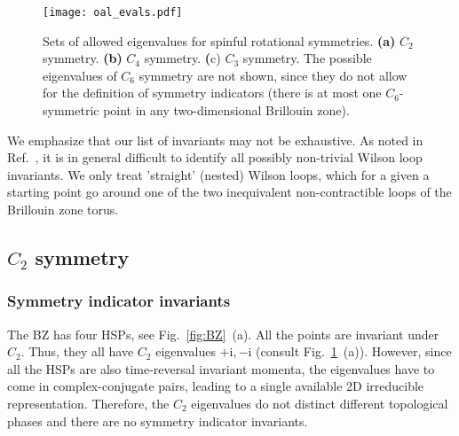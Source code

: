 \begin{figure}[H]
\centering
\texttt{[image: oal\_evals.pdf]}
\caption[Sets of allowed eigenvalues for spinful rotational symmetries]{Sets of allowed eigenvalues for spinful rotational symmetries. \textbf{(a)} $C_2$ symmetry. \textbf{(b)} $C_4$ symmetry. \textbf({c)} $C_3$ symmetry. The possible eigenvalues of $C_6$ symmetry are not shown, since they do not allow for the definition of symmetry indicators (there is at most one $C_6$-symmetric point in any two-dimensional Brillouin zone).}
\label{fig:eigvalsets}
\end{figure}

We emphasize that our list of invariants may not be exhaustive. As noted in Ref.~\cite{BarryFragile}, it is in general difficult to identify all possibly non-trivial Wilson loop invariants. We only treat 'straight' (nested) Wilson loops, which for a given a starting point go around one of the two inequivalent non-contractible loops of the Brillouin zone torus.

\subsection{$C_2$ symmetry}
\subsubsection*{Symmetry indicator invariants} 
The BZ has four HSPs, see Fig.~\ref{fig:BZ}~(a). All the points are invariant under $C_2$. Thus, they all have $C_2$ eigenvalues ${+\mathrm{i},-\mathrm{i}}$ (consult Fig.~\ref{fig:eigvalsets}~(a)). However, since all the HSPs are also time-reversal invariant momenta, the eigenvalues have to come in complex-conjugate pairs, leading to a single available 2D irreducible representation. Therefore, the $C_2$ eigenvalues do not distinct different topological phases and there are no symmetry indicator invariants.

